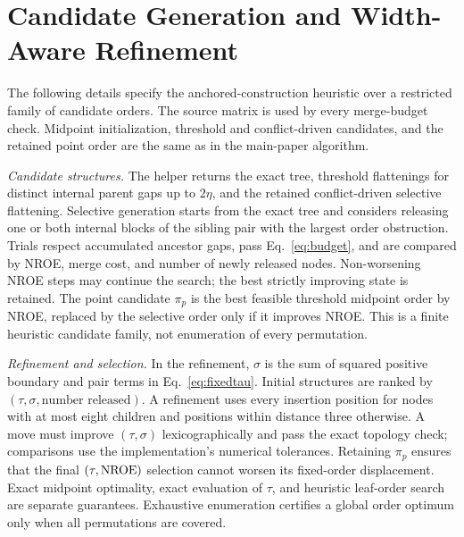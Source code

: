 \documentclass[10pt]{article}
\begin{document}
\begin{algorithm}[tp]
\caption{Optimal Merge Barriers for a Fixed Leaf Order}\label{alg:barriers}
\end{algorithm}

\section{Candidate Generation and Width-Aware Refinement}\label{sec:search}
The following details specify the anchored-construction heuristic over a restricted family of candidate orders. The source matrix is used by every merge-budget check. Midpoint initialization, threshold and conflict-driven candidates, and the retained point order are the same as in the main-paper algorithm.

\emph{Candidate structures.} The helper returns the exact tree, threshold flattenings for distinct internal parent gaps up to $2\eta$, and the retained conflict-driven selective flattening. Selective generation starts from the exact tree and considers releasing one or both internal blocks of the sibling pair with the largest order obstruction. Trials respect accumulated ancestor gaps, pass Eq.~\ref{eq:budget}, and are compared by NROE, merge cost, and number of newly released nodes. Non-worsening NROE steps may continue the search; the best strictly improving state is retained. The point candidate $\pi_p$ is the best feasible threshold midpoint order by NROE, replaced by the selective order only if it improves NROE. This is a finite heuristic candidate family, not enumeration of every permutation.

\emph{Refinement and selection.} In the refinement, $\sigma$ is the sum of squared positive boundary and pair terms in Eq.~\ref{eq:fixedtau}. Initial structures are ranked by $(\tau,\sigma,\text{number released})$. A refinement uses every insertion position for nodes with at most eight children and positions within distance three otherwise. A move must improve $(\tau,\sigma)$ lexicographically and pass the exact topology check; comparisons use the implementation's numerical tolerances. Retaining $\pi_p$ ensures that the final $(\tau,\mathrm{NROE})$ selection cannot worsen its fixed-order displacement. Exact midpoint optimality, exact evaluation of $\tau$, and heuristic leaf-order search are separate guarantees. Exhaustive enumeration certifies a global order optimum only when all permutations are covered.
\end{document}

